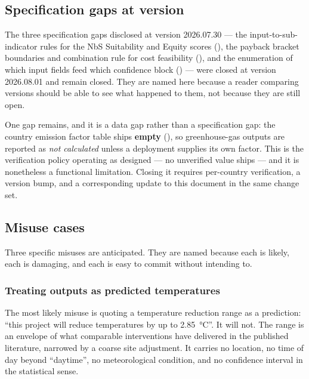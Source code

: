 \subsection{Specification gaps at version \methver{}}

The three specification gaps disclosed at version 2026.07.30 --- the
input-to-sub-indicator rules for the NbS Suitability and Equity scores
(), the payback bracket boundaries and
combination rule for cost feasibility (), and the
enumeration of which input fields feed which confidence block
() --- were closed at version 2026.08.01 and remain
closed. They are named here because a reader comparing versions should be able
to see what happened to them, not because they are still open.

One gap remains, and it is a data gap rather than a specification gap: the
country emission factor table ships \textbf{empty} (), so
greenhouse-gas outputs are reported as \emph{not calculated} unless a
deployment supplies its own factor. This is the verification policy operating
as designed --- no unverified value ships --- and it is nonetheless a
functional limitation. Closing it requires per-country verification, a version
bump, and a corresponding update to this document in the same change set.

\subsection{Misuse cases}
\label{sec:misuse}

Three specific misuses are anticipated. They are named because each is likely,
each is damaging, and each is easy to commit without intending to.

\subsubsection{Treating outputs as predicted temperatures}

The most likely misuse is quoting a temperature reduction range as a
prediction: ``this project will reduce temperatures by up to
\qty{2.85}{\degreeCelsius}''. It will not. The range is an envelope of what
comparable interventions have delivered in the published literature, narrowed
by a coarse site adjustment. It carries no location, no time of day beyond
``daytime'', no meteorological condition, and no confidence interval in the
statistical sense.

